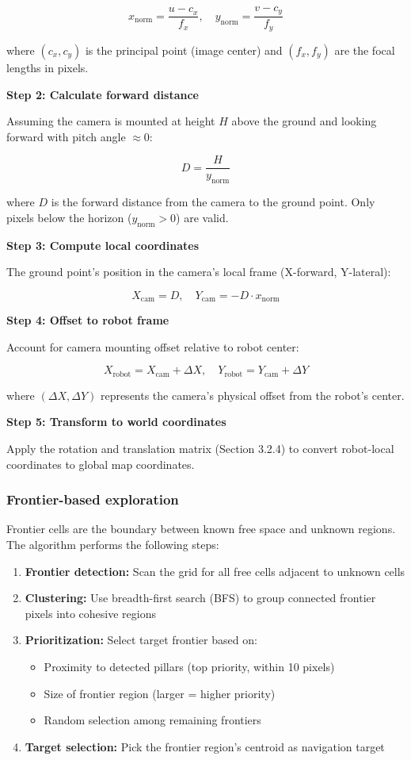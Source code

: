 \documentclass{article}
\begin{document}
$$
x_{\text{norm}} = \frac{u - c_x}{f_x}, \quad y_{\text{norm}} = \frac{v - c_y}{f_y}
$$

\noindent where $(c_x, c_y)$ is the principal point (image center) and $(f_x, f_y)$ are the focal lengths in pixels.

\textbf{Step 2: Calculate forward distance}

Assuming the camera is mounted at height $H$ above the ground and looking forward with pitch angle $\approx 0$:

$$
D = \frac{H}{y_{\text{norm}}}
$$

\noindent where $D$ is the forward distance from the camera to the ground point. Only pixels below the horizon ($y_{\text{norm}} > 0$) are valid.

\textbf{Step 3: Compute local coordinates}

The ground point's position in the camera's local frame (X-forward, Y-lateral):

$$
X_{\text{cam}} = D, \quad Y_{\text{cam}} = -D \cdot x_{\text{norm}}
$$

\textbf{Step 4: Offset to robot frame}

Account for camera mounting offset relative to robot center:

$$
X_{\text{robot}} = X_{\text{cam}} + \Delta X, \quad Y_{\text{robot}} = Y_{\text{cam}} + \Delta Y
$$

\noindent where $(\Delta X, \Delta Y)$ represents the camera's physical offset from the robot's center.

\textbf{Step 5: Transform to world coordinates}

Apply the rotation and translation matrix (Section 3.2.4) to convert robot-local coordinates to global map coordinates.

\subsubsection{Frontier-based exploration}

Frontier cells are the boundary between known free space and unknown regions. The algorithm performs the following steps:

\begin{enumerate}
    \item \textbf{Frontier detection:} Scan the grid for all free cells adjacent to unknown cells
    \item \textbf{Clustering:} Use breadth-first search (BFS) to group connected frontier pixels into cohesive regions
    \item \textbf{Prioritization:} Select target frontier based on:
    \begin{itemize}
        \item Proximity to detected pillars (top priority, within 10 pixels)
        \item Size of frontier region (larger = higher priority)
        \item Random selection among remaining frontiers
    \end{itemize}
    \item \textbf{Target selection:} Pick the frontier region's centroid as navigation target
\end{enumerate}
\end{document}
